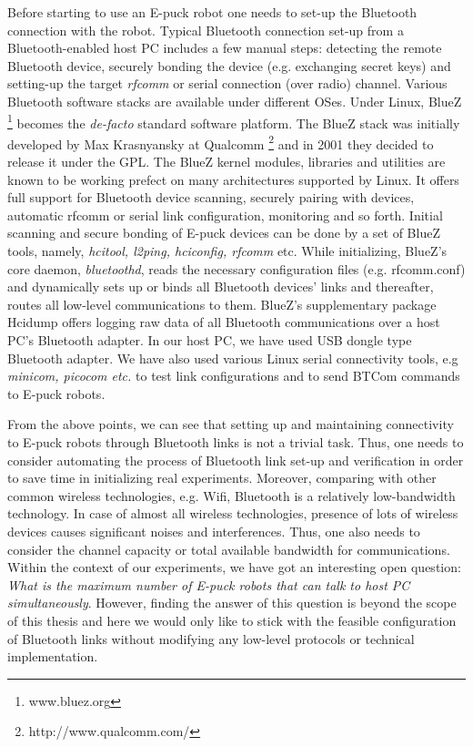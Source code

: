 Before starting to use an E-puck robot  one needs to set-up the Bluetooth connection with the robot. Typical Bluetooth connection set-up from a Bluetooth-enabled host PC includes a few manual steps:  detecting the remote Bluetooth device, securely bonding the device (e.g.  exchanging secret keys) and setting-up the target {\em rfcomm} or serial connection (over radio) channel. Various Bluetooth software stacks are available under different OSes. Under Linux, BlueZ \footnote{www.bluez.org} becomes the {\em de-facto} standard software platform. The BlueZ stack was initially developed by Max Krasnyansky at Qualcomm \footnote{http://www.qualcomm.com/} and in 2001  they decided to release it under the GPL. The BlueZ kernel modules, libraries and utilities are known to be working prefect on many architectures supported by Linux. It offers full support for Bluetooth device scanning, securely pairing with devices, automatic rfcomm or serial link configuration, monitoring and so forth. Initial  scanning and secure bonding of E-puck devices can be done by a set of BlueZ tools, namely, {\em hcitool, l2ping, hciconfig, rfcomm} etc. While initializing, BlueZ's  core daemon, {\em bluetoothd}, reads the necessary configuration files (e.g. rfcomm.conf) and dynamically sets up or binds all Bluetooth devices' links and thereafter, routes all low-level communications to them. BlueZ's supplementary package Hcidump offers logging raw data of all Bluetooth communications over a host PC's Bluetooth adapter.  In our host PC, we have used USB dongle type  Bluetooth adapter. We have also used various Linux serial connectivity tools, e.g {\em minicom, picocom etc.} to test link configurations and to send BTCom commands to E-puck robots.

From the above points, we can see that setting up and maintaining connectivity to E-puck robots through Bluetooth links is  not a trivial task. Thus, one needs to consider automating the process of Bluetooth link set-up and verification in order to save time in initializing real experiments. Moreover, comparing with other common wireless technologies, e.g. Wifi, Bluetooth is a relatively low-bandwidth technology. In case of almost all wireless technologies, presence of lots of wireless devices  causes significant noises and interferences. Thus, one also needs to consider the channel capacity or total available bandwidth for communications. Within the context of our experiments, we have got an interesting open question: {\em What is the maximum number of E-puck robots that can talk to host PC simultaneously}. However, finding the answer of this question is beyond the scope of this thesis and here we would only like  to stick with the feasible configuration of Bluetooth links without modifying any low-level protocols or technical implementation.

